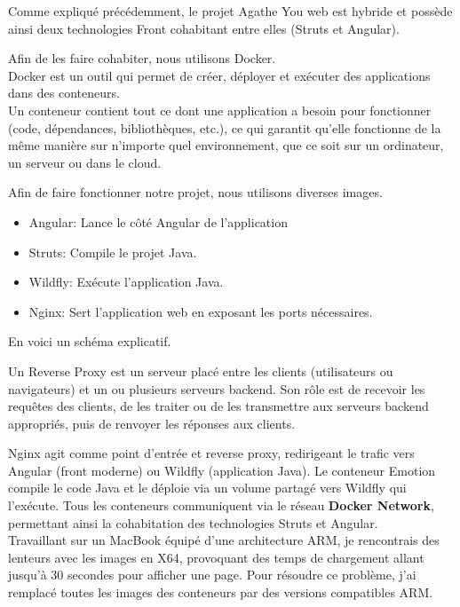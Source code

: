 \documentclass{article}
\begin{document}
Comme expliqué précédemment, le projet Agathe You web est hybride et possède ainsi deux technologies Front cohabitant entre elles (Struts et Angular). 

Afin de les faire cohabiter, nous utilisons Docker. \\

Docker est un outil qui permet de créer, déployer et exécuter des applications dans des conteneurs. \\
Un conteneur contient tout ce dont une application a besoin pour fonctionner (code, dépendances, bibliothèques, etc.), ce qui garantit qu'elle fonctionne de la même manière sur n'importe quel environnement, que ce soit sur un ordinateur, un serveur ou dans le cloud.

Afin de faire fonctionner notre projet, nous utilisons diverses images.

\begin{itemize}
    \item Angular: Lance le côté Angular de l'application 
    \item Struts: Compile le projet Java.
    \item Wildfly: Exécute l'application Java.
    \item Nginx: Sert l'application web en exposant les ports nécessaires.
\end{itemize}

En voici un schéma explicatif.


Un Reverse Proxy est un serveur placé entre les clients (utilisateurs ou navigateurs) et un ou plusieurs serveurs backend. Son rôle est de recevoir les requêtes des clients, de les traiter ou de les transmettre aux serveurs backend appropriés, puis de renvoyer les réponses aux clients.

Nginx agit comme point d'entrée et reverse proxy, redirigeant le trafic vers Angular (front moderne) ou Wildfly (application Java). Le conteneur Emotion compile le code Java et le déploie via un volume partagé vers Wildfly qui l'exécute. Tous les conteneurs communiquent via le réseau \textbf{Docker Network}, permettant ainsi la cohabitation des technologies Struts et Angular. \\

Travaillant sur un MacBook équipé d'une architecture ARM, je rencontrais des lenteurs avec les images en X64, provoquant des temps de chargement allant jusqu'à 30 secondes pour afficher une page. Pour résoudre ce problème, j'ai remplacé toutes les images des conteneurs par des versions compatibles ARM.
\end{document}
